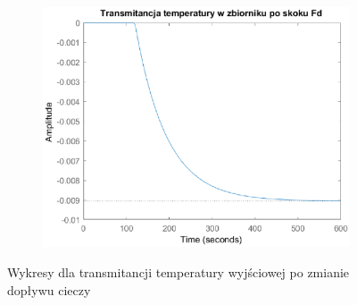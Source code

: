 \begin{figure}[h!]
   \begin{subfigure}[b]{0.6\textwidth}
      \includegraphics[width=1\linewidth]{img/transforms/transformTFd.eps}
      \caption{}
      \label{fig:fig:transformTF3}
   \end{subfigure}
       
   \caption{Wykresy dla transmitancji temperatury wyjściowej po zmianie dopływu cieczy}
   \label{fig:transformTF}
\end{figure}
           
